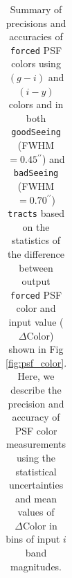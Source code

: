 \documentclass[useamsfonts]{pasj01}
\def\asec{$^{\prime\prime}$}
\def\forced{\texttt{forced}}
\def\tracts{\texttt{tracts}}
\begin{document}
\begin{table}
\begin{center}
\begin{tabular}{| c | c | c | c | c | c | }
    \hline
    \end{tabular}
    \end{center}
    \caption{
        Summary of precisions and accuracies of \forced{} PSF colors using $(g-i)$ and 
        $(i-y)$ colors and in both \texttt{goodSeeing} (FWHM$=0.45$\asec{}) and
        \texttt{badSeeing} (FWHM$=0.70$\asec{}) \tracts{} based on the statistics of 
        the difference between output \forced{} PSF color and input value 
        ($\Delta\mathrm{Color}$) shown in Fig \ref{fig:psf_color}.
        Here, we describe the precision and accuracy of PSF color measurements using 
        the statistical uncertainties and mean values of $\Delta\mathrm{Color}$ in 
        bins of input $i$ band magnitudes.
    }
        \label{tab:psfcolor}
\end{table}
\end{document}
